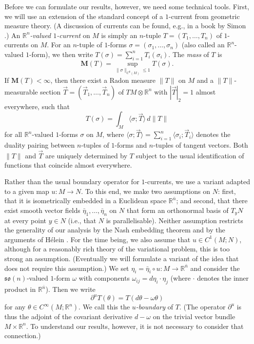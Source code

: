 \documentclass[10pt,a4paper]{amsart}
\newcommand{\R}{\mathbb{R}}
\newcommand{\M}{\mathbf{M}}
\newcommand{\ndim}{{\bar{n}}}
\newcommand{\so}{\mathfrak{so}}
\newcommand{\pairing}[2]{\langle #1; #2 \rangle}
\begin{document}
Before we can formulate our results, however, we need some technical tools.
First, we will use an extension of the standard concept of a $1$-current from geometric measure theory.
(A discussion of currents can be found, e.g., in a book by Simon \cite{Simon:83}.)
An \emph{$\R^n$-valued $1$-current} on $M$ is simply an $n$-tuple $T = (T_1, \dotsc, T_n)$
of $1$-currents on $M$. For an $n$-tuple of $1$-forms $\sigma = (\sigma_1, \dotsc, \sigma_n)$ (also called an $\R^n$-valued $1$-form), we then write
$T(\sigma) = \sum_{i = 1}^n T_i(\sigma_i)$. The \emph{mass} of $T$ is
\[
\M(T) = \sup_{\|\sigma\|_{C^0(M)} \le 1} T(\sigma).
\]
If $\M(T) < \infty$, then there exist a Radon measure $\|T\|$ on $M$ and a $\|T\|$-measurable section $\vec{T} = (\vec{T}_1, \dotsc, \vec{T}_n)$ of $TM \otimes \R^n$ with $|\vec{T}|_2 = 1$ almost everywhere, such that
\[
T(\sigma) = \int_M \pairing{\sigma}{\vec{T}} \, d\|T\|
\]
for all $\R^n$-valued $1$-forms $\sigma$ on $M$, where
$\pairing{\sigma}{\vec{T}} = \sum_{i = 1}^n \pairing{\sigma_i}{\vec{T}_i}$
denotes the duality pairing between $n$-tuples of $1$-forms and $n$-tuples of
tangent vectors.
Both $\|T\|$ and $\vec{T}$ are uniquely determined by $T$ subject to the
usual identification of functions that coincide almost everywhere.

Rather than the usual boundary operator for $1$-currents, we use a variant adapted to a given map $u \colon M \to N$. To this end, we make two assumptions on $N$: first, that it is isometrically embedded in a Euclidean space $\R^\ndim$; and second, that there exist smooth vector fields $\bar{\eta}_1, \dotsc, \bar{\eta}_n$ on $N$ that form an orthonormal basis of $T_y N$ at every point $y \in N$ (i.e., that $N$ is parallelisable).
Neither assumption restricts the
generality of our analysis by the Nash embedding theorem \cite{Nash:56}
and by the arguments of H\'elein \cite{Helein:91.1}.
For the time being, we also assume that $u \in C^1(M; N)$, although for a reasonably rich theory of the variational problem,
this is too strong an assumption. (Eventually we will formulate a variant of
the idea that does not require this assumption.)
We set $\eta_i = \bar{\eta}_i \circ u \colon M \to \R^\ndim$ and consider the $\so(n)$-valued $1$-form $\omega$ with components
$\omega_{ij} = d\eta_i \cdot \eta_j$ (where $\cdot$ denotes the inner
product in $\R^\ndim$). Then we write
\[
\partial^u T(\theta) = T(d\theta - \omega \theta)
\]
for any $\theta \in C^\infty(M; \R^n)$.
We call this the \emph{$u$-boundary} of $T$. (The operator $\partial^u$ is
thus the adjoint of the covariant derivative $d - \omega$ on the trivial
vector bundle $M \times \R^n$.
To understand our results, however, it is not necessary to consider that connection.)
\end{document}
